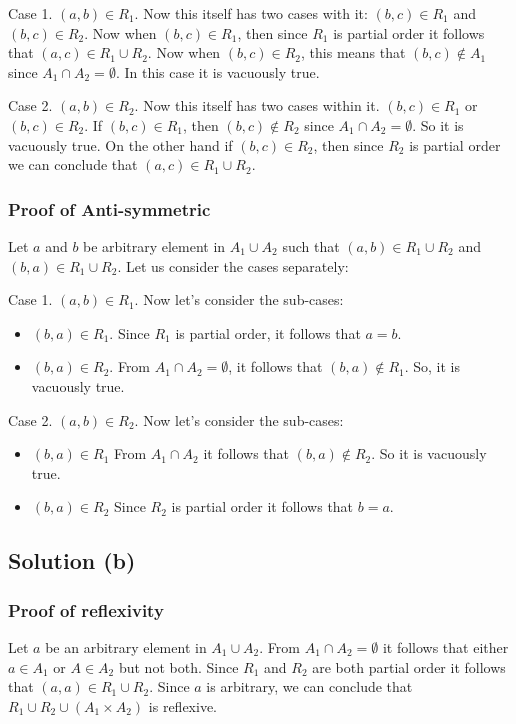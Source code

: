 \documentclass{article}
\begin{document}
Case 1. $(a,b) \in R_1$. Now this itself has two cases with it: $(b,c)
\in R_1$ and $(b,c) \in R_2$. Now when $(b,c) \in R_1$, then since
$R_1$ is partial order it follows that $(a,c) \in R_1 \cup R_2$. Now
when $(b,c) \in R_2$, this means that $(b,c) \notin A_1$ since $A_1
\cap A_2 = \emptyset $. In this case it is vacuously true.

Case 2. $(a,b) \in R_2$. Now this itself has two cases within it.
$(b,c) \in R_1$ or $(b,c) \in R_2$. If $(b,c) \in R_1$, then $(b,c)
\notin R_2$ since $A_1 \cap A_2 = \emptyset$. So it is vacuously true.
On the other hand if $(b,c) \in R_2$, then since $R_2$ is partial
order we can conclude that $(a,c) \in R_1 \cup R_2$.

\subsubsection{Proof of Anti-symmetric}
Let $a$ and $b$ be arbitrary element in $A_1 \cup A_2$ such that
$(a,b) \in R_1 \cup R_2$ and $(b,a) \in R_1 \cup R_2$. Let us consider
the cases separately:

Case 1. $(a,b) \in R_1$. Now let's consider the sub-cases:
\begin{itemize}
\item $(b,a) \in R_1$. Since $R_1$ is partial order, it follows that
  $a = b$.
\item $(b,a) \in R_2$. From $A_1 \cap A_2 = \emptyset$, it follows
  that $(b,a) \notin R_1$. So, it is vacuously true.
\end{itemize}

Case 2. $(a,b) \in R_2$. Now let's consider the sub-cases:
\begin{itemize}
\item $(b,a) \in R_1$ From $A_1 \cap A_2$ it follows that $(b,a)
  \notin R_2$. So it is vacuously true.
\item $(b,a) \in R_2$ Since $R_2$ is partial order it follows that $b
  = a$.
\end{itemize}

\subsection{Solution (b)}
\subsubsection{Proof of reflexivity}
Let $a$ be an arbitrary element in $A_1 \cup A_2$. From $A_1 \cap A_2
= \emptyset$ it follows that either $a \in A_1$ or $A \in A_2$ but not
both. Since $R_1$ and $R_2$ are both partial order it follows that
$(a,a) \in R_1 \cup R_2$. Since $a$ is arbitrary, we can conclude that
$R_1 \cup R_2 \cup (A_1 \times A_2)$ is reflexive.
\end{document}
